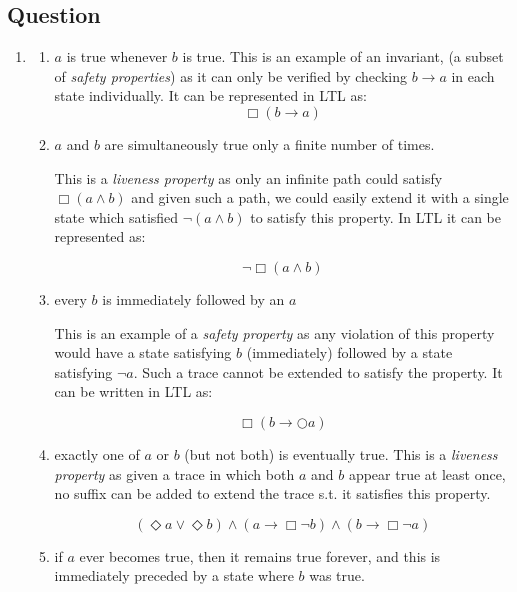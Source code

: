 \documentclass[12pt,a4paper]{article}
\newcounter{question}\setcounter{question}{1}
\newenvironment{question}{%
\subsection*{Question \arabic{question}}}%
{\stepcounter{question}}
\begin{document}
\begin{question}
  \begin{enumerate}[label= (\alph*)]
    \item
          \begin{enumerate}[label= (\roman*)]
            \item
                  $a$ is true whenever $b$ is true. This is an example of an invariant, (a subset of \textit{safety properties}) as it can only be verified by checking $b \rightarrow a$ in each state individually. It can be represented in LTL as:
                  \[
                  \Box (b \rightarrow a)
                  \]

            \item
                  $a$ and $b$ are simultaneously true only a finite number of times.

                  This is a \textit{liveness property} as only an infinite path could satisfy $\Box(a \wedge b)$ and given such a path, we could easily extend it with a single state which satisfied $\neg (a \wedge b)$ to satisfy this property. In LTL it can be represented as: 


                  \[
                  \neg \Box (a \wedge b)
                  \]

            \item
                  every $b$ is immediately followed by an $a$

                  This is an example of a \textit{safety property} as any violation of this property would have a state satisfying $b$ (immediately) followed by a state satisfying $\neg a$. Such a trace cannot be extended to satisfy the property. It can be written in LTL as:


                  \[
                  \Box ( b \rightarrow \bigcirc a )
                  \]

            \item
                  exactly one of $a$ or $b$ (but not both) is eventually true. This is a \textit{liveness property} as given a trace in which both $a$ and $b$ appear true at least once, no suffix can be added to extend the trace s.t. it satisfies this property.

                  \[
                  (\Diamond a \vee \Diamond b) \wedge (a \rightarrow \Box \neg b) \wedge (b \rightarrow \Box \neg a)
                  \]

            \item
                  if $a$ ever becomes true, then it remains true forever, and this is immediately preceded by a state where $b$ was true.


\end{enumerate}
\end{enumerate}
\end{question}
\end{document}
